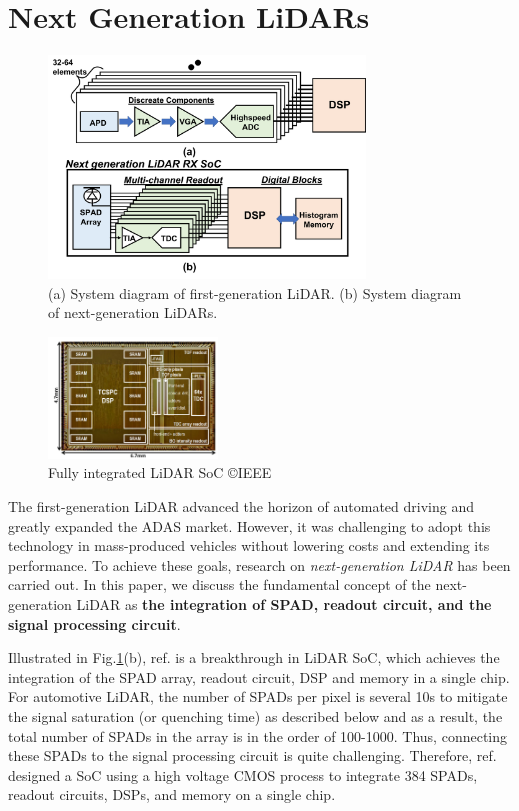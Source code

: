\documentclass[paper]{ieice}
\begin{document}
\section{Next Generation LiDARs}
\begin{figure}[!t]
\centering
 \includegraphics[width=0.75\textwidth]{figs/nextlidar.png}
  \caption{(a) System diagram of first-generation LiDAR. (b) System diagram of next-generation LiDARs.}
\label{next}
\end{figure}

\begin{figure}[!t]
\centering
 \includegraphics[width=0.4\textwidth]{figs/niclasschip.png}
  \caption{Fully integrated LiDAR SoC \cite{niclass20130} \copyright IEEE}
\label{chip}
\end{figure}

\qquad The first-generation LiDAR advanced the horizon of automated driving and greatly expanded the ADAS market. However, it was challenging to adopt this technology in mass-produced vehicles without lowering costs and extending its performance. 
To achieve these goals, research on \textit{next-generation LiDAR} has been carried out.
In this paper, we discuss the fundamental concept of the next-generation LiDAR as \textbf{the integration of SPAD, readout circuit, and the signal processing circuit}.

Illustrated in Fig.\ref{next}(b), ref.\cite{niclass20130} is a breakthrough in LiDAR SoC, which achieves the integration of the SPAD array, readout circuit, DSP and memory in a single chip. For automotive LiDAR, the number of SPADs per pixel is several 10s to mitigate the signal saturation (or quenching time) as described below and as a result, the total number of SPADs in the array is in the order of 100-1000. Thus, connecting these SPADs to the signal processing circuit is quite challenging. Therefore, ref.\cite{niclass20130} designed a SoC using a high voltage CMOS process to integrate 384 SPADs, readout circuits, DSPs, and memory on a single chip.
\end{document}
